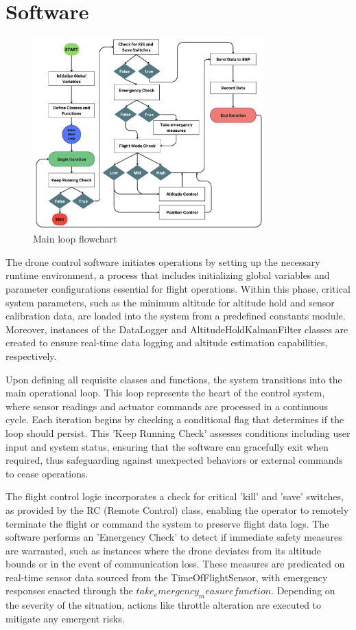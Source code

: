 \documentclass{article}
\begin{document}
\section{Software}
\begin{figure}[H]
  \centering
  \includegraphics[width=0.8\textwidth]{Pictures/main_loop_flowchart.png}
  \caption{Main loop flowchart}
  \label{fig:main_loop_flowchart}
\end{figure}
The drone control software initiates operations by setting up the necessary runtime environment, a process that includes initializing global variables and parameter configurations essential for flight operations. Within this phase, critical system parameters, such as the minimum altitude for altitude hold and sensor calibration data, 
are loaded into the system from a predefined constants module. Moreover, instances of the DataLogger and AltitudeHoldKalmanFilter classes are created to ensure real-time data logging and altitude estimation capabilities, respectively.

Upon defining all requisite classes and functions, the system transitions into the main operational loop. This loop represents the heart of the control system, where sensor readings and actuator commands are processed in a continuous cycle. Each iteration begins by checking a conditional flag that determines if the loop should persist. 
This 'Keep Running Check' assesses conditions including user input and system status, ensuring that the software can gracefully exit when required, thus safeguarding against unexpected behaviors or external commands to cease operations.

The flight control logic incorporates a check for critical 'kill' and 'save' switches, as provided by the RC (Remote Control) class, enabling the operator to remotely terminate the flight or command the system to preserve flight data logs. The software performs an 'Emergency Check' to detect if immediate safety measures are warranted, 
such as instances where the drone deviates from its altitude bounds or in the event of communication loss. These measures are predicated on real-time sensor data sourced from the TimeOfFlightSensor, with emergency responses enacted through the \(take_emergency_measure function\). Depending on the severity of the situation, actions like 
throttle alteration are executed to mitigate any emergent risks.
\end{document}
